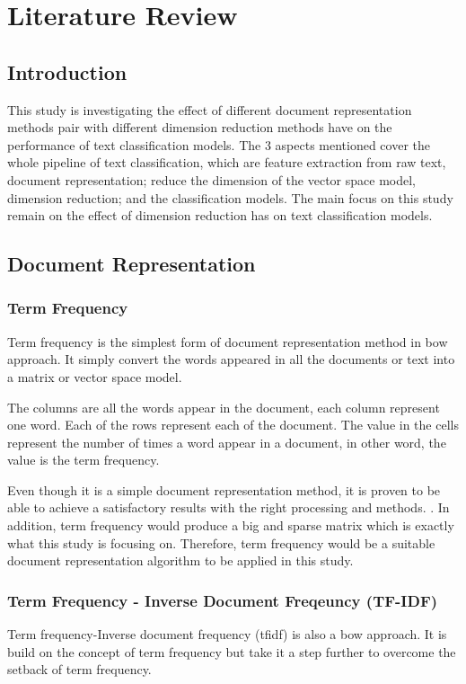 \chapter{Literature Review}
\section{Introduction}
This study is investigating the effect of different document representation methods pair with different dimension reduction methods have on the performance of text classification models. The 3 aspects mentioned cover the whole pipeline of text classification, which are feature extraction from raw text, document representation; reduce the dimension of the vector space model, dimension reduction; and the classification models. The main focus on this study remain on the effect of dimension reduction has on text classification models.\\

\section{Document Representation}
\subsection{Term Frequency}
Term frequency is the simplest form of document representation method in \ac{bow} approach. It simply convert the words appeared in all the documents or text into a matrix or vector space model.

The columns are all the words appear in the document, each column represent one word. Each of the rows represent each of the document. The value in the cells represent the number of times a word appear in a document, in other word, the value is the term frequency.

Even though it is a simple document representation method, it is proven to be able to achieve a satisfactory results with the right processing and methods. \cite{knnVectorSpaceReduction}. In addition, term frequency would produce a big and sparse matrix which is exactly what this study is focusing on. Therefore, term frequency would be a suitable document representation algorithm to be applied in this study.\\

\clearpage
\subsection{Term Frequency - Inverse Document Freqeuncy (TF-IDF)}
Term frequency-Inverse document frequency (\ac{tfidf}) is also a \ac{bow} approach. It is build on the concept of term frequency but take it a step further to overcome the setback of term frequency. 

